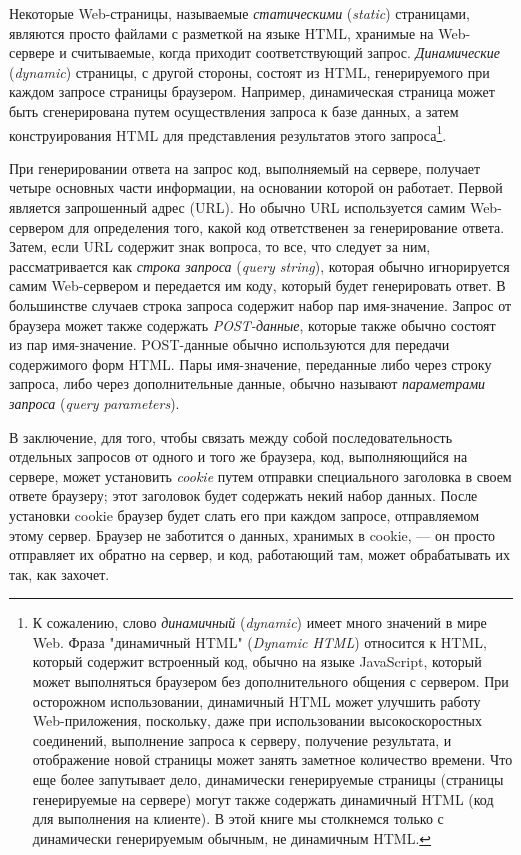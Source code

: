 Некоторые Web-страницы, называемые \textit{статическими} (\textit{static}) страницами,
являются просто файлами с разметкой на языке HTML, хранимые на Web-сервере и считываемые,
когда приходит соответствующий запрос. \textit{Динамические} (\textit{dynamic}) страницы,
с другой стороны, состоят из HTML, генерируемого при каждом запросе страницы
браузером. Например, динамическая страница может быть сгенерирована путем осуществления
запроса к базе данных, а затем конструирования HTML для представления результатов этого
запроса\footnote{К сожалению, слово \textit{динамичный} (\textit{dynamic}) имеет много
  значений в мире Web. Фраза "динамичный HTML" (\textit{Dynamic HTML}) относится к HTML,
  который содержит встроенный код, обычно на языке JavaScript, который может выполняться
  браузером без дополнительного общения с сервером. При осторожном использовании,
  динамичный HTML может улучшить работу Web-приложения, поскольку, даже при использовании
  высокоскоростных соединений, выполнение запроса к серверу, получение результата, и
  отображение новой страницы может занять заметное количество времени. Что еще более
  запутывает дело, динамически генерируемые страницы (страницы генерируемые на сервере)
  могут также содержать динамичный HTML (код для выполнения на клиенте). В этой книге мы
  столкнемся только с динамически генерируемым обычным, не динамичным HTML.}.

При генерировании ответа на запрос код, выполняемый на сервере, получает четыре основных
части информации, на основании которой он работает. Первой является запрошенный адрес
(URL). Но обычно URL используется самим Web-сервером для определения того, какой код
ответственен за генерирование ответа. Затем, если URL содержит знак вопроса, то все, что
следует за ним, рассматривается как \textit{строка запроса} (\textit{query string}),
которая обычно игнорируется самим Web-сервером и передается им коду, который будет
генерировать ответ. В большинстве случаев строка запроса содержит набор пар
имя-значение. Запрос от браузера может также содержать \textit{POST-данные}, которые также
обычно состоят из пар имя-значение. POST-данные обычно используются для передачи
содержимого форм HTML. Пары имя-значение, переданные либо через строку запроса, либо через
дополнительные данные, обычно называют \textit{параметрами запроса} (\textit{query
  parameters}).

В заключение, для того, чтобы связать между собой последовательность отдельных запросов от
одного и того же браузера, код, выполняющийся на сервере, может установить \textit{cookie}
путем отправки специального заголовка в своем ответе браузеру; этот заголовок будет
содержать некий набор данных. После установки cookie браузер будет слать его при каждом
запросе, отправляемом этому сервер. Браузер не заботится о данных, хранимых в cookie, ---
он просто отправляет их обратно на сервер, и код, работающий там, может обрабатывать их
так, как захочет.

